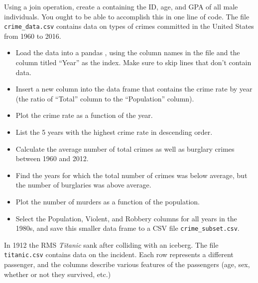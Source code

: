 Using a join operation, create a  containing the ID, age, and GPA of all male individuals.
You ought to be able to accomplish this in one line of code.
The file \texttt{crime\_data.csv} contains data on types of crimes committed in the United States from 1960 to 2016.
\begin{itemize}
\item Load the data into a pandas , using the column names in the file and the column titled
``Year'' as the index.
Make sure to skip lines that don't contain data.

\item Insert a new column into the data frame that contains the crime rate by year (the ratio of ``Total'' column
to the ``Population'' column).

\item Plot the crime rate as a function of the year.

\item List the 5 years with the highest crime rate in descending order.

\item Calculate the average number of total crimes as well as burglary crimes between 1960 and 2012.

\item Find the years for which the total number of crimes was below average, but the number of burglaries
was above average.

\item Plot the number of murders as a function of the population.

\item Select the Population, Violent, and Robbery columns for all years in the 1980s, and save
this smaller data frame to a CSV file \texttt{crime\_subset.csv}.
\end{itemize}

In 1912 the RMS \emph{Titanic} sank after colliding with an iceberg.
The file \texttt{titanic.csv} contains data on the incident.
Each row represents a different passenger, and the columns describe various features of the passengers (age, sex, whether or not they survived, etc.)

